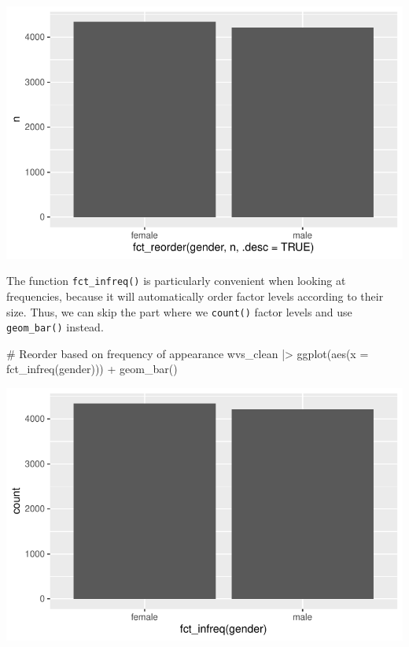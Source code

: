 \documentclass[
  letterpaper,
  DIV=11,
  numbers=noendperiod]{scrreprt}
\newenvironment{Shaded}{\begin{snugshade}}{\end{snugshade}}
\newcommand{\AttributeTok}[1]{\textcolor[rgb]{0.40,0.45,0.13}{#1}}
\newcommand{\CommentTok}[1]{\textcolor[rgb]{0.37,0.37,0.37}{#1}}
\newcommand{\FunctionTok}[1]{\textcolor[rgb]{0.28,0.35,0.67}{#1}}
\newcommand{\NormalTok}[1]{\textcolor[rgb]{0.00,0.23,0.31}{#1}}
\newcommand{\SpecialCharTok}[1]{\textcolor[rgb]{0.37,0.37,0.37}{#1}}
\begin{document}
\includegraphics{07_data_wrangling_files/figure-pdf/reorder-by-other-variable-1.pdf}

The function \texttt{fct\_infreq()} is particularly convenient when
looking at frequencies, because it will automatically order factor
levels according to their size. Thus, we can skip the part where we
\texttt{count()} factor levels and use \texttt{geom\_bar()} instead.

\begin{Shaded}
\begin{Highlighting}[]
\CommentTok{\# Reorder based on frequency of appearance}
\NormalTok{wvs\_clean }\SpecialCharTok{|\textgreater{}}
  \FunctionTok{ggplot}\NormalTok{(}\FunctionTok{aes}\NormalTok{(}\AttributeTok{x =} \FunctionTok{fct\_infreq}\NormalTok{(gender))) }\SpecialCharTok{+}
  \FunctionTok{geom\_bar}\NormalTok{()}
\end{Highlighting}
\end{Shaded}

\includegraphics{07_data_wrangling_files/figure-pdf/reorder-by-other-variable-infreq-1.pdf}
\end{document}
